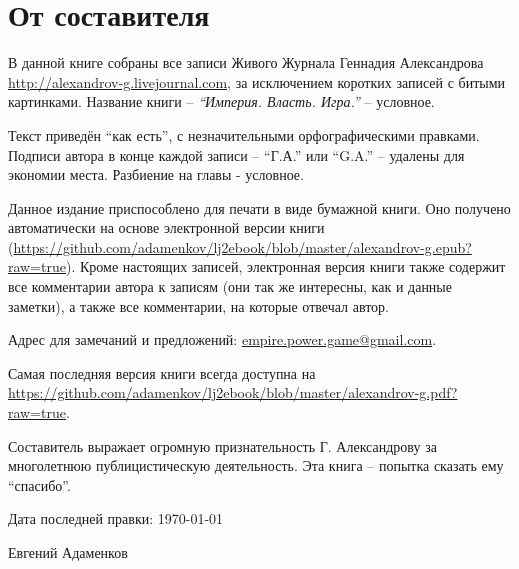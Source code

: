 \onecolumn
\section*{От составителя}
\indent В данной книге собраны все записи Живого Журнала Геннадия Александрова \url{http://alexandrov-g.livejournal.com}, за исключением коротких записей с битыми картинками.  Название книги – \textit{“Империя. Власть. Игра.”} – условное.

Текст приведён “как есть”, с незначительными орфографическими правками. Подписи автора в конце каждой записи – “Г.А.” или “G.A.” – удалены для экономии места.  Разбиение на главы - условное.

Данное издание приспособлено для печати в виде бумажной книги.  Оно получено автоматически на основе электронной версии книги (\url{https://github.com/adamenkov/lj2ebook/blob/master/alexandrov-g.epub?raw=true}).  Кроме настоящих записей, электронная версия книги также содержит все комментарии автора к записям (они так же интересны, как и данные заметки), а также все комментарии, на которые отвечал автор.

Адрес для замечаний и предложений: \url{empire.power.game@gmail.com}.

Самая последняя версия книги всегда доступна на \url{https://github.com/adamenkov/lj2ebook/blob/master/alexandrov-g.pdf?raw=true}.

Составитель выражает огромную признательность Г. Александрову за многолетнюю публицистическую деятельность. Эта книга – попытка сказать ему “спасибо”.

Дата последней правки: \today
\begin{flushright}
Евгений Адаменков
\end{flushright}
\twocolumn
